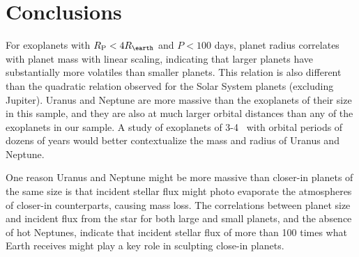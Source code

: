 \documentclass[11pt]{aastex}
\newcommand{\rspecial}{4 \rearth}
\begin{document}
\section{Conclusions}
For exoplanets with $\rpl < \rspecial$ and $P < 100$ days, planet radius correlates with planet mass with linear scaling, indicating that larger planets have substantially more volatiles than smaller planets.  This relation is also different than the quadratic relation observed for the Solar System planets (excluding Jupiter).  Uranus and Neptune are more massive than the exoplanets of their size in this sample, and they are also at much larger orbital distances than any of the exoplanets in our sample.  A study of exoplanets of 3-4 \rearth\ with orbital periods of dozens of years would better contextualize the mass and radius of Uranus and Neptune.

One reason Uranus and Neptune might be more massive than closer-in planets of the same size is that incident stellar flux might photo evaporate the atmospheres of closer-in counterparts, causing mass loss.  The correlations between planet size and incident flux from the star for both large and small planets, and the absence of hot Neptunes, indicate that incident stellar flux of more than 100 times what Earth receives might play a key role in sculpting close-in planets.
\end{document}
